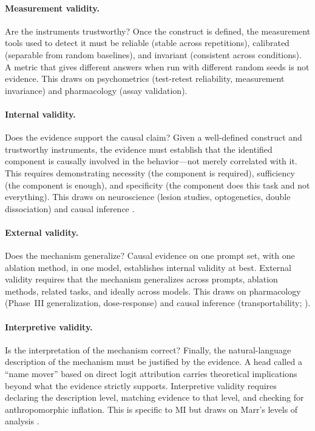 \documentclass[10pt]{article}
\begin{document}
\paragraph{Measurement validity.} Are the instruments trustworthy? Once the construct is defined, the measurement tools used to detect it must be reliable (stable across repetitions), calibrated (separable from random baselines), and invariant (consistent across conditions). A metric that gives different answers when run with different random seeds is not evidence. This draws on psychometrics (test-retest reliability, measurement invariance) and pharmacology (assay validation).

\paragraph{Internal validity.} Does the evidence support the causal claim? Given a well-defined construct and trustworthy instruments, the evidence must establish that the identified component is causally involved in the behavior---not merely correlated with it. This requires demonstrating necessity (the component is required), sufficiency (the component is enough), and specificity (the component does this task and not everything). This draws on neuroscience (lesion studies, optogenetics, double dissociation) and causal inference \citep{pearl2009causality}.

\paragraph{External validity.} Does the mechanism generalize? Causal evidence on one prompt set, with one ablation method, in one model, establishes internal validity at best. External validity requires that the mechanism generalizes across prompts, ablation methods, related tasks, and ideally across models. This draws on pharmacology (Phase~III generalization, dose-response) and causal inference (transportability; \citealp{pearl2011transportability}).

\paragraph{Interpretive validity.} Is the interpretation of the mechanism correct? Finally, the natural-language description of the mechanism must be justified by the evidence. A head called a ``name mover'' based on direct logit attribution carries theoretical implications beyond what the evidence strictly supports. Interpretive validity requires declaring the description level, matching evidence to that level, and checking for anthropomorphic inflation. This is specific to MI but draws on Marr's levels of analysis \citep{marr1982vision}.
\end{document}
